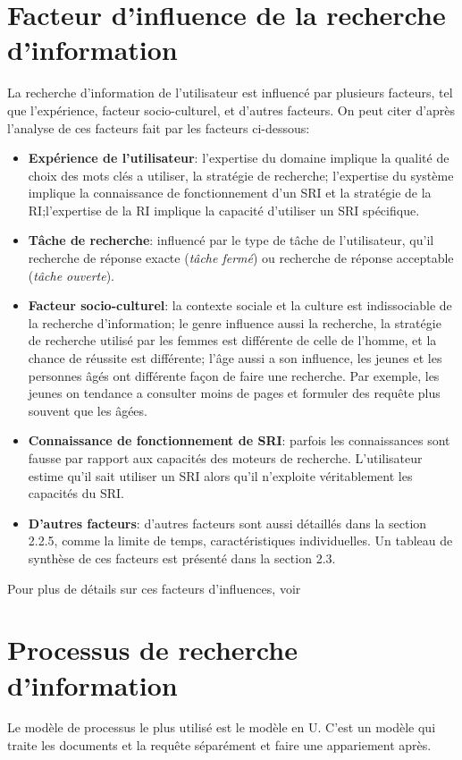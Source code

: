 \section{Facteur d'influence de la recherche d'information}
La recherche d'information de l'utilisateur est influencé par plusieurs facteurs, tel que l'expérience, facteur socio-culturel, et d'autres facteurs.
On peut citer d'après l'analyse de ces facteurs fait par \citeauthor{ri-sur-le-web} \citep{ri-sur-le-web} les facteurs ci-dessous:
\begin{itemize}
    \item \textbf{Expérience de l'utilisateur}: l'expertise du domaine implique la qualité de choix des mots clés a utiliser, la stratégie de recherche; l'expertise du système implique la connaissance de fonctionnement d'un SRI et la stratégie de la RI;l'expertise de la RI implique la capacité d'utiliser un SRI spécifique.
    \item \textbf{Tâche de recherche}: influencé par le type de tâche de l'utilisateur, qu'il recherche de réponse exacte (\textit{tâche fermé}) ou recherche de réponse acceptable (\textit{tâche ouverte}).
    \item \textbf{Facteur socio-culturel}: la contexte sociale et la culture est indissociable de la recherche d'information; le genre influence aussi la recherche, la stratégie de recherche utilisé par les femmes est différente de celle de l'homme, et la chance de réussite est différente; l'âge aussi a son influence, les jeunes et les personnes âgés ont différente façon de faire une recherche. Par exemple, les jeunes on tendance a consulter moins de pages et formuler des requête plus souvent que les âgées.
    \item \textbf{Connaissance de fonctionnement de SRI}: parfois les connaissances sont fausse par rapport aux capacités des moteurs de recherche. L'utilisateur estime qu'il sait utiliser un SRI alors qu'il n'exploite véritablement les capacités du SRI\@.
    \item \textbf{D'autres facteurs}: d'autres facteurs sont aussi détaillés dans la section 2.2.5, comme la limite de temps, caractéristiques individuelles. Un tableau de synthèse de ces facteurs est présenté dans la section 2.3.
\end{itemize}

Pour plus de détails sur ces facteurs d'influences, voir 

\section{Processus de recherche d'information}\label{sec:processus-ri}
Le modèle de processus le plus utilisé est le modèle en U. C'est un modèle qui traite les documents et la requête séparément et faire une appariement après.

